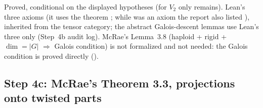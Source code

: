 \begin{status}
Proved, conditional on the displayed hypotheses (for $V_2$ only  remains). Lean's three axioms (it uses the theorem ; while  was an axiom the report also listed ), inherited from the tensor category; the abstract Galois-descent lemmas use Lean's three only (Step~4b audit
log). McRae's Lemma~3.8 (haploid + rigid + $\dim=|G|$ $\Rightarrow$ Galois condition) is not formalized and not needed:
the Galois condition is proved directly ().
\end{status}

\subsection{Step 4c: McRae's Theorem 3.3, projections onto twisted parts}

